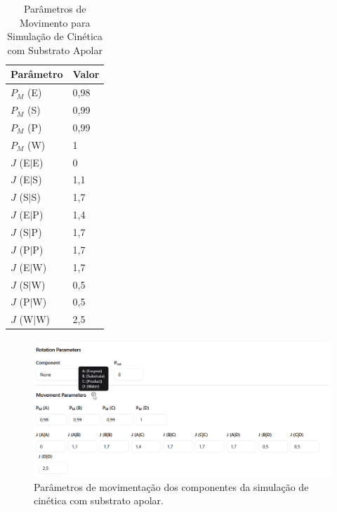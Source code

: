 \documentclass[12pt,oneside]{report}
\begin{document}
\begin{table}[H]
    \centering
    \caption{Parâmetros de Movimento para Simulação de Cinética com Substrato Apolar}
    \vspace{0.2cm}
    \begin{tabularx}{\textwidth}{X m{5cm}}
        \hline
        \textbf{Parâmetro} & \textbf{Valor} \\
        \hline
        $P_M$ (E)          & 0{,}98         \\
        $P_M$ (S)          & 0{,}99         \\
        $P_M$ (P)          & 0{,}99         \\
        $P_M$ (W)          & 1              \\
        $J$ (E$|$E)        & 0              \\
        $J$ (E$|$S)        & 1{,}1          \\
        $J$ (S$|$S)        & 1{,}7          \\
        $J$ (E$|$P)        & 1{,}4          \\
        $J$ (S$|$P)        & 1{,}7          \\
        $J$ (P$|$P)        & 1{,}7          \\
        $J$ (E$|$W)        & 1{,}7          \\
        $J$ (S$|$W)        & 0{,}5          \\
        $J$ (P$|$W)        & 0{,}5          \\
        $J$ (W$|$W)        & 2{,}5          \\
        \hline
    \end{tabularx}
    \vspace{0.2cm}
    \label{tab:params_movimento_apolar}
\end{table}

\begin{figure}[H]
    \centering
    \includegraphics[width=1\textwidth]{img/movement_MM_apolar.png}
    \caption{\small Parâmetros de movimentação dos componentes da simulação de cinética com substrato apolar.}
    \label{fig:michaelis_menten_movement_apolar}
\end{figure}
\end{document}
